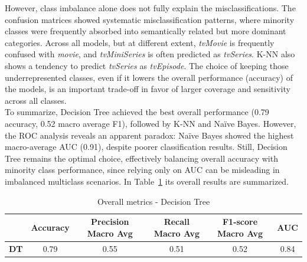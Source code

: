 However, class imbalance alone does not fully explain the misclassifications. The confusion matrices showed systematic misclassification patterns, 
where minority classes were frequently absorbed into semantically related but more dominant categories. 
Across all models, but at different extent, \textit{tvMovie} is frequently confused with \textit{movie}, and \textit{tvMiniSeries} is often predicted as \textit{tvSeries}.
K-NN also shows a tendency to predict \textit{tvSeries} as \textit{tvEpisode}.
The choice of keeping those underrepresented classes, even if it lowers the overall performance (accuracy) of the models, 
is an important trade-off in favor of larger coverage and sensitivity across all classes.\\
To summarize, Decision Tree achieved the best overall performance (0.79 accuracy, 0.52 macro average F1), followed by K-NN and Naïve Bayes. 
However, the ROC analysis reveals an apparent paradox: Naïve Bayes showed the highest macro-average AUC (0.91), despite poorer classification results.
Still, Decision Tree remains the optimal choice, effectively balancing overall accuracy with minority class performance, 
since relying only on AUC can be misleading in imbalanced multiclass scenarios.
In Table~\ref{tab:best_model_multiclass_classification} its overall results are summarized.
\begin{table}[H]
    \centering
    \begin{tabular}{cccccc}
        \toprule
        \bf{ } & \bf{Accuracy} & \bf{Precision Macro Avg} & \bf{Recall Macro Avg} & \bf{F1-score Macro Avg} & \bf{AUC} \\
        \midrule
        \bf{DT} & 0.79 & 0.55 & 0.51 & 0.52 & 0.84 \\
        \bottomrule
    \end{tabular}
    \caption{Overall metrics - Decision Tree}
    \label{tab:best_model_multiclass_classification}
\end{table}


 






